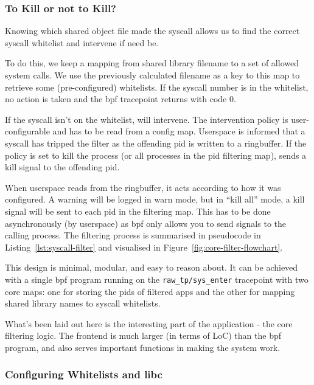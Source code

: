 \subsubsection{To Kill or not to Kill?}

Knowing which shared object file made the syscall allows us to find the correct
syscall whitelist and intervene if need be.

To do this, we keep a mapping from shared library filename to a set of allowed
system calls. We use the previously calculated filename as a key to this map to
retrieve some (pre-configured) whitelists. If the syscall number is in the
whitelist, no action is taken and the \ac{bpf} tracepoint returns with code 0.

If the syscall isn't on the whitelist, \af will intervene. The intervention
policy is user-configurable and has to be read from a config map. Userspace is
informed that a syscall has tripped the filter as the offending \ac{pid} is
written to a ringbuffer. If the policy is set to kill the process (or all 
processes in the \ac{pid} filtering map), \af sends a kill signal to the 
offending \ac{pid}. 

When userspace reads  from the ringbuffer, it acts according to how it was
configured. A warning will be logged in warn mode, but in ``kill all'' mode, a
kill signal will be sent to each \ac{pid} in the filtering map. This has to be
done asynchronously (by userspace) as \ac{bpf} only allows you to send signals
to the calling process. The filtering process is summarised in pseudocode in
Listing~\ref{lst:syscall-filter} and visualised in 
Figure~\ref{fig:core-filter-flowchart}.

This design is minimal, modular, and easy to reason about. It can be achieved
with a single \ac{bpf} program running on the \texttt{raw\_tp/sys\_enter}
tracepoint with two core maps: one for storing the \acp{pid} of filtered apps
and the other for mapping shared library names to syscall whitelists.

What's been laid out here is the interesting part of the application
- the core filtering logic. The frontend is much larger (in terms of LoC) than
the \ac{bpf} program, and also serves important functions in making the system
work.

\subsubsection{Configuring Whitelists and \ac{libc}}

